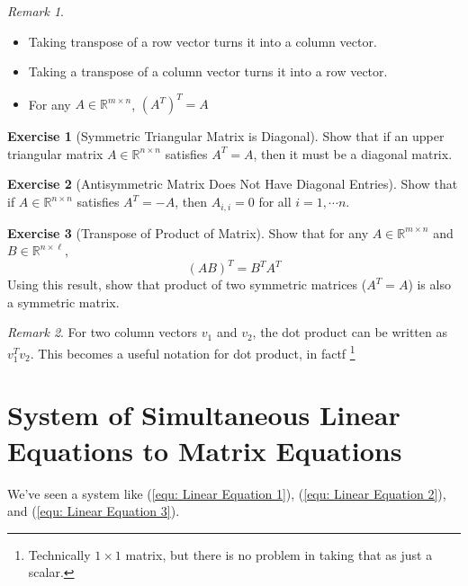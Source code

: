 \documentclass[12pt, a4paper]{article}
\newcommand{\R}{\mathbb{R}}
\theoremstyle{remark}
\newtheorem{remark}{Remark}
\theoremstyle{definition}
\newtheorem{exercise}{Exercise}
\numberwithin{equation}{section}
\numberwithin{definition}{section}
\numberwithin{example}{section}
\numberwithin{exercise}{section}
\numberwithin{remark}{section}
\numberwithin{figure}{section}
\begin{document}
\begin{remark}
    \begin{itemize}
            \item Taking transpose of a row vector turns it into a column vector.
            \item Taking a transpose of a column vector turns it into a row vector.
            \item For any $A \in \R^{m \times n}$, $\left( A^T \right)^T = A$
    \end{itemize}
\end{remark}
\begin{exercise}[Symmetric Triangular Matrix is Diagonal]
    Show that if an upper triangular matrix $A \in \R^{n \times n}$ satisfies $A^T = A$, then it must be a diagonal matrix.
\end{exercise}
\begin{exercise}[Antisymmetric Matrix Does Not Have Diagonal Entries]
    Show that if $A \in \R^{n \times n}$ satisfies $A^T = -A$, then $A_{i,i} = 0$ for all $i = 1, \cdots n$.
\end{exercise}
\begin{exercise}[Transpose of Product of Matrix]
    Show that for any $A \in \R^{m \times n}$ and $B \in \R^{n \times \ell}$,
    \begin{equation*}
        \left( AB \right)^T = B^T A^T
    \end{equation*}
    Using this result, show that product of two symmetric matrices ($A^T = A$) is also a symmetric matrix.
\end{exercise}
\begin{remark}
    For two column vectors $v_1$ and $v_2$, the dot product can be written as $v_1^T v_2$.
    This becomes a useful notation for dot product, in factf
    \footnote{
    Technically $1 \times 1$ matrix, but there is no problem in taking that as just a scalar.}
\end{remark}

\section{System of Simultaneous Linear Equations to Matrix Equations}
We've seen a system like (\ref{equ: Linear Equation 1}), (\ref{equ: Linear Equation 2}), and (\ref{equ: Linear Equation 3}).
\end{document}
